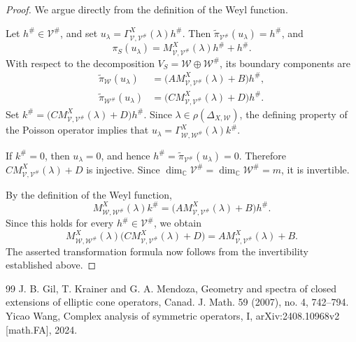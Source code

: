 \documentclass[10pt,a4paper]{amsart}
\numberwithin{equation}{section} \numberwithin{figure}{section}
\newcommand{\mb}[1]{\mathbb{#1}} %
\newcommand{\mc}[1]{\mathcal{#1}}
\begin{document}
\begin{proof}
We argue directly from the definition of the Weyl function.

Let \(h^\#\in\mc V^\#\), and set
\(
    u_\lambda
    =
    \Gamma_{\mc V,\mc V^\#}^X(\lambda)h^\#.
\)
Then
\(\widetilde\pi_{\mc V^\#}(u_\lambda)=h^\#\), and
\[
    \pi_S(u_\lambda)
    =
    M_{\mc V,\mc V^\#}^X(\lambda)h^\#+h^\#.
\]
With respect to the decomposition
\(V_S=\mc W\oplus\mc W^\#\), its boundary components are
\[
\begin{aligned}
    \widetilde\pi_{\mc W}(u_\lambda)
    &=
    \bigl(
        A M_{\mc V,\mc V^\#}^X(\lambda)+B
    \bigr)h^\#,
    \\
    \widetilde\pi_{\mc W^\#}(u_\lambda)
    &=
    \bigl(
        C M_{\mc V,\mc V^\#}^X(\lambda)+D
    \bigr)h^\#.
\end{aligned}
\]
Set
\(
    k^\#
    =
    \bigl(
        C M_{\mc V,\mc V^\#}^X(\lambda)+D
    \bigr)h^\#.
\)
Since \(\lambda\in\rho(\Delta_{X,\mc W})\), the defining property of
the Poisson operator implies that
\(
    u_\lambda
    =
    \Gamma_{\mc W,\mc W^\#}^X(\lambda)k^\#.
\)

If \(k^\#=0\), then \(u_\lambda=0\), and hence
\(h^\#=\widetilde\pi_{\mc V^\#}(u_\lambda)=0\). Therefore
\(C M_{\mc V,\mc V^\#}^X(\lambda)+D\) is injective. Since
\(\dim_{\mb C}\mc V^\#=\dim_{\mb C}\mc W^\#=m\), it is invertible.

By the definition of the Weyl function,
\[
    M_{\mc W,\mc W^\#}^X(\lambda)k^\#
    =
    \bigl(
        A M_{\mc V,\mc V^\#}^X(\lambda)+B
    \bigr)h^\#.
\]
Since this holds for every \(h^\#\in\mc V^\#\), we obtain
\[
    M_{\mc W,\mc W^\#}^X(\lambda)
    \bigl(
        C M_{\mc V,\mc V^\#}^X(\lambda)+D
    \bigr)
    =
    A M_{\mc V,\mc V^\#}^X(\lambda)+B.
\]
The asserted transformation formula now follows from the
invertibility established above.
\end{proof}


\begin{thebibliography}{99}
 J. B. Gil, T. Krainer and G. A. Mendoza, Geometry and spectra of closed extensions of elliptic cone operators, Canad. J. Math. 59 (2007), no. 4, 742--794.
 Yicao Wang, Complex analysis of symmetric operators, I, arXiv:2408.10968v2 [math.FA], 2024.
\end{thebibliography}
\end{document}
